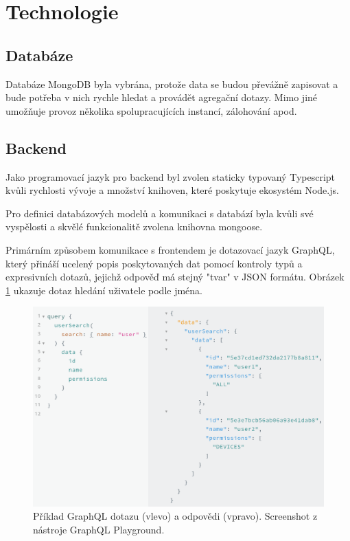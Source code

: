\section{Technologie}

\subsection{Databáze}

Databáze MongoDB byla vybrána, protože data se budou převážně zapisovat a bude potřeba v nich rychle
hledat a provádět agregační dotazy.
Mimo jiné umožňuje provoz několika spolupracujících instancí, zálohování apod. \citep[viz][]{MongoDB}

\subsection{Backend} \label{backend}

Jako programovací jazyk pro backend byl zvolen staticky typovaný Typescript kvůli rychlosti vývoje
a množství knihoven, které poskytuje ekosystém Node.js. \citep[][]{Typescript} \citep[][]{Nodejs}

Pro definici databázových modelů a komunikaci s databází byla kvůli své vyspělosti a skvělé funkcionalitě zvolena
knihovna mongoose. \citep[viz][]{Mongoose}

Primárním způsobem komunikace s frontendem
je dotazovací jazyk GraphQL, který přináší ucelený popis poskytovaných dat pomocí kontroly typů a
expresivních dotazů, jejichž odpověď má stejný "tvar" v JSON formátu. 
Obrázek \ref{fig:graphql_example} ukazuje dotaz hledání uživatele podle jména.

\begin{figure} \centering
\includegraphics[width=145mm]{../img/graphql_example.png}
\caption{Příklad GraphQL dotazu (vlevo) a odpovědi (vpravo). Screenshot z nástroje GraphQL Playground.}
\label{fig:graphql_example}
\end{figure}

